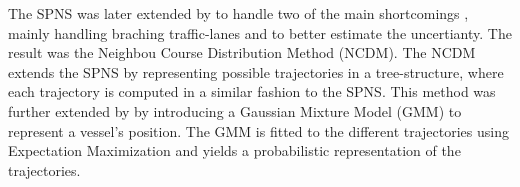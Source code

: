 The SPNS was later extended by \citeauthor{hexeberg} \cite{hexeberg} to handle two of the main shortcomings \cite{dalsnes-hexeberg}, mainly handling braching traffic-lanes and to better estimate the uncertianty. The result was the Neighbou Course Distribution Method (NCDM). The NCDM extends the SPNS by representing possible trajectories in a tree-structure, where each trajectory is computed in a similar fashion to the SPNS. This method was further extended by \citeauthor{dalsnes-hexeberg}\cite{dalsnes-hexeberg} by introducing a Gaussian Mixture Model (GMM) to represent a vessel's position. The GMM is fitted to the different trajectories using Expectation Maximization and yields a probabilistic representation of the trajectories. 
